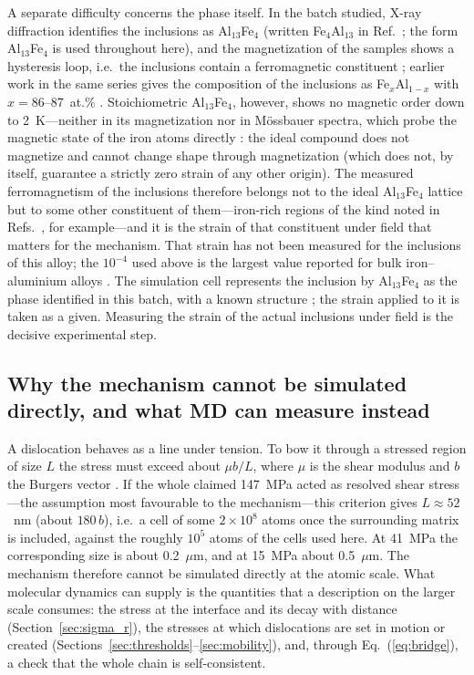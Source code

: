 A separate difficulty concerns the phase itself. In the batch studied, X-ray
diffraction identifies the inclusions as Al$_{13}$Fe$_4$ (written
Fe$_4$Al$_{13}$ in Ref.~\cite{Friha2024JMMM}; the form Al$_{13}$Fe$_4$ is
used throughout here), and the magnetization of the samples shows a
hysteresis loop, i.e.\ the inclusions contain a ferromagnetic constituent
\cite{Friha2024JMMM}; earlier work in the same series gives the composition
of the inclusions as Fe$_x$Al$_{1-x}$ with $x=86$--$87$~at.\%
\cite{Skvortsov2019JAP,Nikolaev2025SciRep}. Stoichiometric Al$_{13}$Fe$_4$,
however, shows no magnetic order down to 2~K---neither in its magnetization
nor in M\"ossbauer spectra, which probe the magnetic state of the iron atoms
directly \cite{Avers2025Crystals,Albedah2015Mossbauer}: the
ideal compound does not magnetize and cannot change shape through
magnetization (which does not, by itself, guarantee a strictly zero strain of
any other origin). The measured ferromagnetism of the inclusions therefore
belongs not to the ideal Al$_{13}$Fe$_4$ lattice but to some other
constituent of them---iron-rich regions of the kind noted in
Refs.~\cite{Skvortsov2019JAP,Nikolaev2025SciRep}, for example---and it is the
strain of that constituent under field that matters for the mechanism. That
strain has not been measured for the inclusions of this alloy; the $10^{-4}$
used above is the largest value reported for bulk iron--aluminium alloys
\cite{Hall1959,BormioNunes2012}. The simulation cell represents the
inclusion by Al$_{13}$Fe$_4$ as the phase identified in this batch, with a
known structure \cite{Liu2024CIF}; the strain applied to it is taken as a
given. Measuring the strain of the actual inclusions under field is the
decisive experimental step.

\subsection{Why the mechanism cannot be simulated directly, and what MD can
measure instead}

A dislocation behaves as a line under tension. To bow it through a stressed
region of size $L$ the stress must exceed about $\mu b/L$, where $\mu$ is
the shear modulus and $b$ the Burgers vector \cite{CaillardMartin2003}. If
the whole claimed 147~MPa acted as resolved shear stress---the assumption most
favourable to the mechanism---this criterion gives $L\approx52$~nm (about
$180\,b$), i.e.\ a cell of some $2\times10^{8}$ atoms once the surrounding
matrix is included, against the roughly $10^{5}$ atoms of the cells used here.
At 41~MPa the corresponding size is about 0.2~$\mu$m, and at 15~MPa
about 0.5~$\mu$m. The mechanism therefore cannot be simulated directly at the
atomic scale. What molecular dynamics can supply is the quantities that a
description on the larger scale consumes: the stress at the interface and its
decay with distance (Section~\ref{sec:sigma_r}), the stresses at which
dislocations are set in motion or created
(Sections~\ref{sec:thresholds}--\ref{sec:mobility}), and, through
Eq.~(\ref{eq:bridge}), a check that the whole chain is self-consistent.

